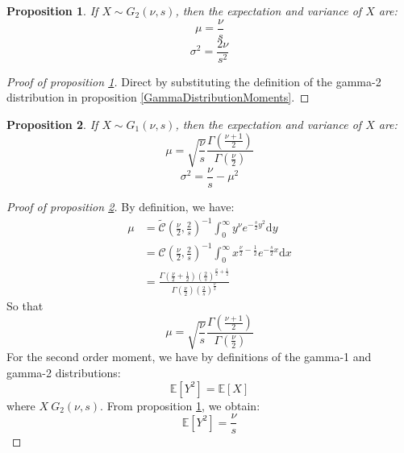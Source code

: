 \documentclass{amsart}
\theoremstyle{plain}
\newtheorem{proposition}{Proposition}[section]
\theoremstyle{remark}
\numberwithin{equation}{section}
\begin{document}
\begin{proposition}
   \label{GammaDistribution:type2:moments}
   If $X\sim G_2(\nu, s)$, then the expectation and variance of $X$ are:
   \[
     \mu = \frac{\nu}{s}
   \]
   \[
     \sigma^2 = \frac{2\nu}{s^2}
   \]
 \end{proposition}

 \begin{proof}[Proof of proposition \ref{GammaDistribution:type2:moments}]
   Direct by substituting the definition of the gamma-2 distribution in proposition \ref{GammaDistributionMoments}.
 \end{proof}

\begin{proposition}
   \label{GammaDistribution:type1:moments}
   If $X\sim G_1(\nu, s)$, then the expectation and variance of $X$ are:
   \[
     \mu = \sqrt{\frac{\nu}{s}}\frac{\Gamma\left(\frac{\nu+1}{2}\right)}{\Gamma\left(\frac{\nu}{2}\right)}
   \]
   \[
     \sigma^2 = \frac{\nu}{s} - \mu^2
   \]
 \end{proposition}

 \begin{proof}[Proof of proposition \ref{GammaDistribution:type1:moments}]
By definition, we have:
\[
  \begin{split}
    \mu &= \widetilde{\mathcal C}\left(\frac{\nu}{2},\frac{2}{s}\right)^{-1}\int_0^{\infty}y^{\nu}e^{-\frac{s}{2}y^2}\mathrm dy\\
    &=\mathcal C\left(\frac{\nu}{2},\frac{2}{s}\right)^{-1}\int_{0}^{\infty}x^{\frac{\nu}{2}-\frac{1}{2}}e^{-\frac{s}{2}x}\mathrm d x\\
    &= \frac{\Gamma\left(\frac{\nu}{2}+\frac{1}{2}\right)\left(\frac{2}{s}\right)^{\frac{\nu}{2}+\frac{1}{2}}}{\Gamma\left(\frac{\nu}{2}\right)\left(\frac{2}{s}\right)^{\frac{\nu}{2}}}
  \end{split}
\]
So that
\[
\mu = \sqrt{\frac{\nu}{s}}\frac{\Gamma\left(\frac{\nu+1}{2}\right)}{\Gamma\left(\frac{\nu}{2}\right)}
\]
For the second order moment, we have by definitions of the gamma-1 and gamma-2 distributions:
\[
\mathbb E\left[Y^2\right] = \mathbb E [X]
\]
where $X~G_2(\nu, s)$. From proposition \ref{GammaDistribution:type2:moments}, we obtain:
\[
\mathbb E\left[Y^2\right] = \frac{\nu}{s}
\]
 \end{proof}
\end{document}

